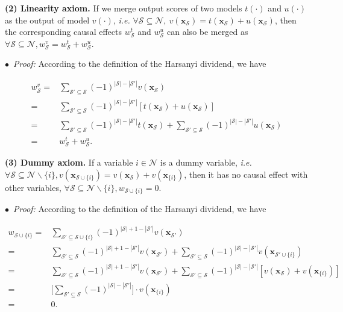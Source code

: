 \textbf{(2) Linearity axiom.} If we merge output scores of two models $t(\cdot)$ and $u(\cdot)$ as the output of model $v(\cdot)$, \emph{i.e.} {\small $\forall \mathcal{S}\subseteq\mathcal{N},~ v(\boldsymbol{x}_{\mathcal{S}})=t(\boldsymbol{x}_{\mathcal{S}})+u(\boldsymbol{x}_{\mathcal{S}})$}, then the corresponding causal effects {\small $w^t_{\mathcal{S}}$} and {\small $w^u_{\mathcal{S}}$} can also be merged as {\small$\forall \mathcal{S}\subseteq \mathcal{N}, w^v_{\mathcal{S}}=w^t_{\mathcal{S}}+w^u_{\mathcal{S}}$}.

$\bullet$~\textit{Proof:} According to the definition of the Harsanyi dividend, we have

\begin{small}
\begin{align*}
w^v_{\mathcal{S}} =& \sum_{\mathcal{S}'\subseteq \mathcal{S}}(-1)^{|\mathcal{S}|-|\mathcal{S}'|}v(\boldsymbol{x}_{\mathcal{S}})\\
=& \sum_{\mathcal{S}'\subseteq \mathcal{S}}(-1)^{|\mathcal{S}|-|\mathcal{S}'|}[t(\boldsymbol{x}_{\mathcal{S}})+u(\boldsymbol{x}_{\mathcal{S}})]\\
=&\sum_{\mathcal{S}'\subseteq \mathcal{S}}(-1)^{|\mathcal{S}|-|\mathcal{S}'|}t(\boldsymbol{x}_{\mathcal{S}})+\sum_{\mathcal{S}'\subseteq \mathcal{S}}(-1)^{|\mathcal{S}|-|\mathcal{S}'|}u(\boldsymbol{x}_{\mathcal{S}})\\
=& w^t_{\mathcal{S}}+w^u_{\mathcal{S}}.
\end{align*}
\end{small}

\textbf{(3) Dummy axiom.} If a variable {\small $i\in\mathcal{N}$} is a dummy variable, \emph{i.e.} 
{\small $\forall \mathcal{S}\subseteq \mathcal{N}\backslash\{i\}, v(\boldsymbol{x}_{\mathcal{S}\cup\{i\}})=v(\boldsymbol{x}_{\mathcal{S}})+v(\boldsymbol{x}_{\{i\}})$}, then it has no causal effect with other variables, {\small $\forall \mathcal{S}\subseteq \mathcal{N}\backslash\{i\}, w_{\mathcal{S}\cup\{i\}}=0$}.

$\bullet$~\textit{Proof:} According to the definition of the Harsanyi dividend, we have

\begin{small}
\begin{align*}
w_{\mathcal{S}\cup\{i\}} =& \sum_{\mathcal{S}'\subseteq \mathcal{S}\cup\{i\}} (-1)^{|\mathcal{S}|+1-|\mathcal{S}'|}v(\boldsymbol{x}_{\mathcal{S}'})\\
=& \sum_{\mathcal{S}'\subseteq \mathcal{S}} (-1)^{|\mathcal{S}|+1-|\mathcal{S}'|}v(\boldsymbol{x}_{\mathcal{S}'}) + \sum_{\mathcal{S}'\subseteq \mathcal{S}} (-1)^{|\mathcal{S}|-|\mathcal{S}'|}v(\boldsymbol{x}_{\mathcal{S}'\cup\{i\}})\\
=& \sum_{\mathcal{S}'\subseteq \mathcal{S}} (-1)^{|\mathcal{S}|+1-|\mathcal{S}'|}v(\boldsymbol{x}_{\mathcal{S}'}) + \sum_{\mathcal{S}'\subseteq \mathcal{S}} (-1)^{|\mathcal{S}|-|\mathcal{S}'|}[v(\boldsymbol{x}_{\mathcal{S}})+v(\boldsymbol{x}_{\{i\}})]\\
=& \Big[\sum_{\mathcal{S}'\subseteq \mathcal{S}}(-1)^{|\mathcal{S}|-|\mathcal{S}'|}\Big]\cdot v(\boldsymbol{x}_{\{i\}})\\
=& 0.
\end{align*}
\end{small}

